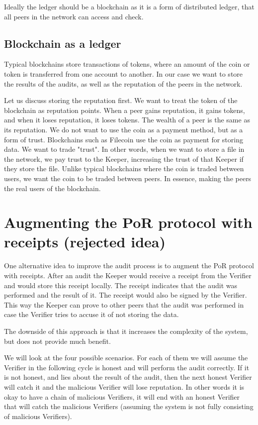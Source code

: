 Ideally the ledger should be a blockchain as it is a form of distributed ledger,
that all peers in the network can access and check.

\subsection{Blockchain as a ledger}

Typical blockchains store transactions of tokens, where an amount of the coin or token
is transferred from one account to another.
In our case we want to store the results of the audits,
as well as the reputation of the peers in the network.

Let us discuss storing the reputation first.
We want to treat the token of the blockchain as reputation points.
When a peer gains reputation, it gains tokens, and when it loses reputation, it loses tokens.
The wealth of a peer is the same as its reputation.
We do not want to use the coin as a payment method, but as a form of trust.
Blockchains such as Filecoin \cite{filecoin} use the coin as payment for storing data.
We want to trade "trust".
In other words, when we want to store a file in the network, we pay trust to the Keeper,
increasing the trust of that Keeper if they store the file.
Unlike typical blockchains where the coin is traded between users,
we want the coin to be traded between peers.
In essence, making the peers the real users of the blockchain.

\section{Augmenting the PoR protocol with receipts (rejected idea)}

One alternative idea to improve the audit process is to augment the PoR protocol with receipts.
After an audit the Keeper would receive a receipt from the Verifier and would store this
receipt locally.
The receipt indicates that the audit was performed and the result of it.
The receipt would also be signed by the Verifier.
This way the Keeper can prove to other peers that the audit was performed
in case the Verifier tries to accuse it of not storing the data.

The downside of this approach is that it increases the complexity of the system,
but does not provide much benefit.

We will look at the four possible scenarios.
For each of them we will assume the Verifier in the following cycle is honest
and will perform the audit correctly.
If it is not honest, and lies about the result of the audit,
then the next honest Verifier will catch it and the malicious Verifier will lose reputation.
In other words it is okay to have a chain of malicious Verifiers,
it will end with an honest Verifier that will catch the malicious Verifiers
(assuming the system is not fully consisting of malicious Verifiers).

